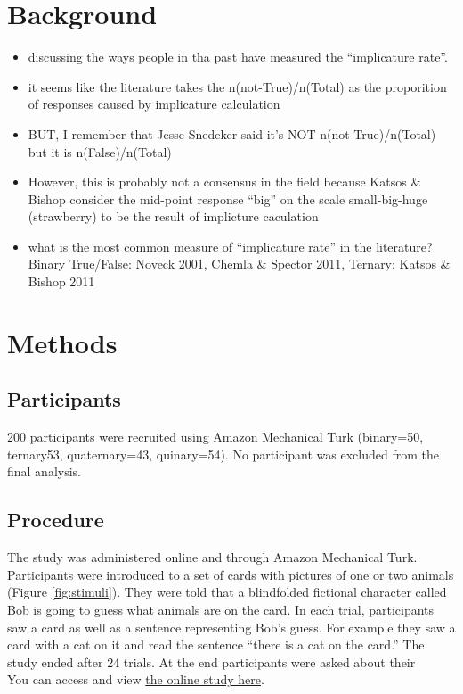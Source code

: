\documentclass[floatsintext,man]{apa6}
\theoremstyle{definition}
\theoremstyle{definition}
\theoremstyle{definition}
\theoremstyle{remark}
\begin{document}
\section{Background}\label{background}

\begin{itemize}
\item
  discussing the ways people in tha past have measured the
  \enquote{implicature rate}.
\item
  it seems like the literature takes the n(not-True)/n(Total) as the
  proporition of responses caused by implicature calculation
\item
  BUT, I remember that Jesse Snedeker said it's NOT n(not-True)/n(Total)
  but it is n(False)/n(Total)
\item
  However, this is probably not a consensus in the field because Katsos
  \& Bishop consider the mid-point response \enquote{big} on the scale
  small-big-huge (strawberry) to be the result of implicture caculation
\item
  what is the most common measure of \enquote{implicature rate} in the
  literature? Binary True/False: Noveck 2001, Chemla \& Spector 2011,
  Ternary: Katsos \& Bishop 2011
\end{itemize}

\section{Methods}\label{methods}

\subsection{Participants}\label{participants}

200 participants were recruited using Amazon Mechanical Turk (binary=50,
ternary53, quaternary=43, quinary=54). No participant was excluded from
the final analysis.

\subsection{Procedure}\label{procedure}

The study was administered online and through Amazon Mechanical Turk.
Participants were introduced to a set of cards with pictures of one or
two animals (Figure \ref{fig:stimuli}). They were told that a
blindfolded fictional character called Bob is going to guess what
animals are on the card. In each trial, participants saw a card as well
as a sentence representing Bob's guess. For example they saw a card with
a cat on it and read the sentence \enquote{there is a cat on the card.}
The study ended after 24 trials. At the end participants were asked
about their\\
You can access and view \href{}{the online study here}.
\end{document}
